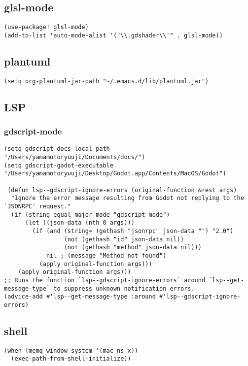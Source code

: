 \documentclass[11pt]{article}
\begin{document}
\subsection{glsl-mode}
\label{sec:org9bf7bf0}
\begin{verbatim}
(use-package! glsl-mode)
(add-to-list 'auto-mode-alist '("\\.gdshader\\'" . glsl-mode))
\end{verbatim}
\subsection{plantuml}
\label{sec:org209d5b9}
\begin{verbatim}
(setq org-plantuml-jar-path "~/.emacs.d/lib/plantuml.jar")
\end{verbatim}
\subsection{LSP}
\label{sec:org62d3128}
\subsubsection{gdscript-mode}
\label{sec:orga30f463}
\begin{verbatim}
(setq gdscript-docs-local-path "/Users/yamamotoryuuji/Documents/docs/")
(setq gdscript-godot-executable "/Users/yamamotoryuuji/Desktop/Godot.app/Contents/MacOS/Godot")

 (defun lsp--gdscript-ignore-errors (original-function &rest args)
  "Ignore the error message resulting from Godot not replying to the `JSONRPC' request."
  (if (string-equal major-mode "gdscript-mode")
      (let ((json-data (nth 0 args)))
        (if (and (string= (gethash "jsonrpc" json-data "") "2.0")
                 (not (gethash "id" json-data nil))
                 (not (gethash "method" json-data nil)))
            nil ; (message "Method not found")
          (apply original-function args)))
    (apply original-function args)))
;; Runs the function `lsp--gdscript-ignore-errors` around `lsp--get-message-type` to suppress unknown notification errors.
(advice-add #'lsp--get-message-type :around #'lsp--gdscript-ignore-errors)
\end{verbatim}
\subsection{shell}
\label{sec:org72c1d32}
\begin{verbatim}
(when (memq window-system '(mac ns x))
  (exec-path-from-shell-initialize))
\end{verbatim}
\end{document}
